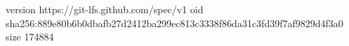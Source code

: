 version https://git-lfs.github.com/spec/v1
oid sha256:889e80b6b0dbafb27d2412ba299ec813c3338f86da31c3fd39f7af9829d4f3a0
size 174884

